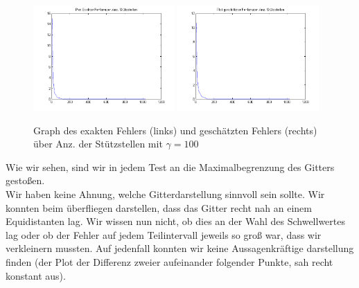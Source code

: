 \documentclass[11pt,a4paper,ngerman]{article}
\begin{document}
\begin{figure}[h!]
\centering
\includegraphics[width=0.48\textwidth]{f3_1.png}
\includegraphics[width=0.48\textwidth]{f3_2.png}
\caption{Graph des exakten Fehlers (links) und geschätzten Fehlers (rechts) über Anz. der Stützstellen mit $\gamma = 100$ \label{fig:f3}}
\end{figure}

Wie wir sehen, sind wir in jedem Test an die Maximalbegrenzung des Gitters gestoßen.\\

Wir haben keine Ahnung, welche Gitterdarstellung sinnvoll sein sollte. Wir konnten beim überfliegen darstellen, dass das Gitter recht nah an
einem Equidistanten lag. Wir wissen nun nicht, ob dies an der Wahl des Schwellwertes lag oder ob der Fehler auf jedem Teilintervall jeweils so groß war,
dass wir verkleinern mussten. Auf jedenfall konnten wir keine Aussagenkräftige darstellung finden (der Plot der Differenz zweier aufeinander folgender Punkte,
sah recht konstant aus).
\newpage
$\quad$
\label{LastPage}
\end{document}
